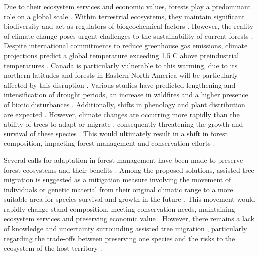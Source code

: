 Due to their ecosystem services and economic values, forests play a predominant role on a global scale \citep{Balvanera2006Quantifyingevidence}. 
Within terrestrial ecosystems, they maintain significant biodiversity and act as regulators of biogeochemical factors \citep{Pawson2013Plantationforests}. 
However, the reality of climate change poses urgent challenges to the sustainability of current forests \citep{McKenney2009Climatechange,Trumbore2015Foresthealth,Seidl2017Forestdisturbances,Messier2022Warningnatural}. 
Despite international commitments to reduce greenhouse gas emissions, climate projections predict a global temperature exceeding 1.5 C above preindustrial temperatures \citep{Matthews2022Currentglobal}. 
Canada is particularly vulnerable to this warming, due to its northern latitudes \citep{Alo2008Potentialfuture,Bush2019Canadachanging} and forests in Eastern North America will be particularly affected by this disruption \citep{Park2014Canboreal,Mahony2017closerlook,Sittaro2017Treerange,Messier2022Warningnatural}. 
Various studies have predicted lengthening and intensification of drought periods, an increase in wildfires and a higher presence of biotic disturbances \citep{Parmesan2007Influencesspecies,Joyce2013Climatechange,Gatti2021Amazoniacarbon,Heidari2021Effectsclimate}. 
Additionally, shifts in phenology and plant distribution are expected \citep{Aitken2008Adaptationmigration,Chuine2010Whydoes,Zhu2012Failuremigrate,Gray2013Trackingsuitable}. 
However, climate changes are occurring more rapidly than the ability of trees to adapt or migrate \citep{Aitken2008Adaptationmigration,Loarie2009velocityclimate,Vitt2010Assistedmigration,Harrison2020Plantcommunity}, 
consequently threatening the growth and survival of these species \citep{Zhu2012Failuremigrate,Sittaro2017Treerange,Woodall2018Decadalchanges}.
This would ultimately result in a shift in forest composition, impacting forest management and conservation efforts \citep{McKenney2009Climatechange,Chmura2011Forestresponses,Lo2011Linkingclimate}.

Several calls for adaptation in forest management have been made to preserve forest ecosystems and their benefits \citep{Nagel2017Adaptivesilviculture,Messier2021sakeresilience}. 
Among the proposed solutions, assisted tree migration is suggested as a mitigation measure involving the movement of individuals or genetic material from their original climatic range to a more suitable area for species survival and growth in the future \citep{Vitt2010Assistedmigration,Dumroese2015Considerationsrestoring,Park2018Informationunderload,Park2023Provenancetrials}. 
This movement would rapidly change stand composition, meeting conservation needs, maintaining ecosystem services and preserving economic value \citep{Pedlar2011implementationassisted,Ste-Marie2011Assistedmigration,Winder2011Ecologicalimplications}. 
However, there remains a lack of knowledge and uncertainty surrounding assisted tree migration \citep{Klenk2015assistedmigration,Park2018Informationunderload}, particularly regarding the trade-offs between preserving one species and the risks to the ecosystem of the host territory \citep{McLachlan2007frameworkdebate,Vitt2010Assistedmigration,Hewitt2011Takingstock}.

